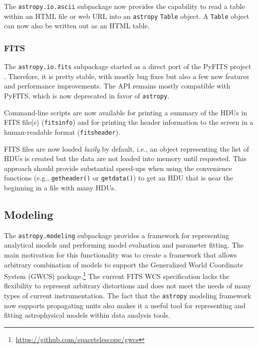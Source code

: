 \documentclass[modern]{aastex61}
\newcommand{\package}[1]{\texttt{#1}\xspace}
\newcommand{\astropypkg}{\package{astropy}}
\begin{document}
The \package{astropy.io.ascii} subpackage now provides the capability
to read a table within an HTML file or web URL into an \astropypkg
\texttt{Table} object. A \texttt{Table} object can now also
be written out as an HTML table.

\subsubsection{FITS}

The \package{astropy.io.fits} subpackage started as a direct port of the
PyFITS project \citep{PyFITS}. Therefore, it is pretty stable, with mostly bug
fixes but also a few new features and performance improvements.  The API
remains mostly compatible with PyFITS, which is now deprecated in favor of
\astropypkg.

Command-line scripts are now available for printing a summary of the HDUs in
FITS file(s) (\texttt{fitsinfo}) and for printing the header information to
the screen in a human-readable format (\texttt{fitsheader}).

FITS files are now loaded \emph{lazily} by default, i.e., an object
representing the list of HDUs is created but the data are not loaded into
memory until requested.  This approach should provide substantial speed-ups
when using the convenience functions (e.g., \texttt{getheader()} or
\texttt{getdata()}) to get an HDU that is near the beginning in a file with
many HDUs.

\subsection{Modeling}
\label{sec:modeling}

The \package{astropy.modeling} subpackage provides a framework for representing
analytical models and performing model evaluation and parameter fitting.
The main motivation for this functionality was to create a framework that
allows arbitrary combination of models to support the Generalized World
Coordinate System (GWCS) package.\footnote{\url{https://github.com/spacetelescope/gwcs}}
The current FITS WCS specification lacks the flexibility to represent
arbitrary distortions and does not meet the needs of many types of current instrumentation.
The fact that the \astropypkg modeling framework now supports propagating
units also makes it a useful tool for representing and fitting astrophysical
models within data analysis tools.
\end{document}
